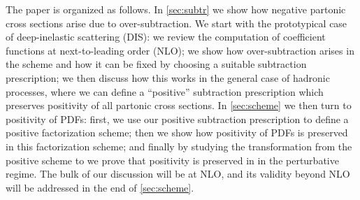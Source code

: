 The paper is organized as follows. In \cref{sec:subtr} we show
how negative partonic cross sections arise due to over-subtraction. We
start with the   prototypical case of deep-inelastic scattering (DIS): we
review the computation of coefficient functions at next-to-leading
order (NLO); we show how over-subtraction arises in the \msbar{} scheme
and how it can be fixed by choosing a suitable subtraction
prescription; we then discuss how this works in the general case of
hadronic processes, where we can define a ``positive'' subtraction prescription
which preserves
positivity of all partonic cross sections.
In \cref{sec:scheme} we then turn to
positivity of PDFs: first, we use our positive subtraction
prescription to define a positive factorization scheme; then we show
how positivity of PDFs is preserved in this factorization scheme; and
finally by studying the transformation from the positive scheme to  \msbar{}
we prove that positivity is preserved in \msbar{} in the perturbative
regime. The bulk of our discussion will be at NLO, and its validity
beyond NLO will be addressed in the end of \cref{sec:scheme}.

